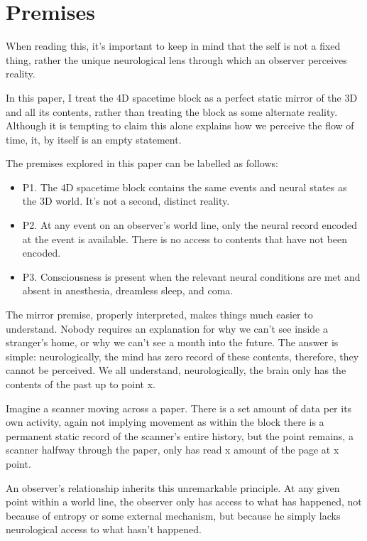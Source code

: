 \documentclass[11pt,a4paper]{article}
\begin{document}
\section{Premises}

When reading this, it’s important to keep in mind that the self is not a fixed thing, rather the unique neurological lens through which an observer perceives reality.

In this paper, I treat the 4D spacetime block as a perfect static mirror of the 3D and all its contents, rather than treating the block as some alternate reality. Although it is tempting to claim this alone explains how we perceive the flow of time, it, by itself is an empty statement.

The premises explored in this paper can be labelled as follows:

\begin{itemize}
	\item P1. The 4D spacetime block contains the same events and neural states as the 3D world. It’s not a second, distinct reality.
	\item P2. At any event on an observer’s world line, only the neural record encoded at the event is available. There is no access to contents that have not been encoded.
	\item P3. Consciousness is present when the relevant neural conditions are met and absent in anesthesia, dreamless sleep, and coma.
\end{itemize}

The mirror premise, properly interpreted, makes things much easier to understand. Nobody requires an explanation for why we can’t see inside a stranger’s home, or why we can’t see a month into the future. The answer is simple: neurologically, the mind has zero record of these contents, therefore, they cannot be perceived. We all understand, neurologically, the brain only has the contents of the past up to point x.

Imagine a scanner moving across a paper. There is a set amount of data per its own activity, again not implying movement as within the block there is a permanent static record of the scanner’s entire history, but the point remains, a scanner halfway through the paper, only has read x amount of the page at x point.

An observer’s relationship inherits this unremarkable principle. At any given point within a world line, the observer only has access to what has happened, not because of entropy or some external mechanism, but because he simply lacks neurological access to what hasn't happened.
\end{document}
